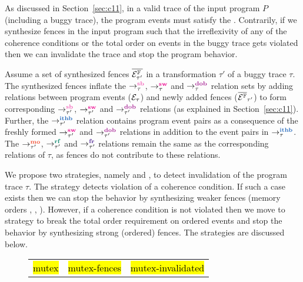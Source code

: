 As discussed in Section~\ref{sec:c11}, in a valid trace of the
input program $P$ (including a buggy trace), 
the program events must satisfy the .
%
Contrarily, if we synthesize \cc fences in the input program 
such that the irreflexivity of any of the coherence conditions 
or the total order on \sc events in the buggy trace gets violated 
then we can invalidate the trace and stop the program behavior.

Assume a set of synthesized \cc fences $\overline{\mathcal{E}^{\mathbb{F}}_{\tau'}}$
in a transformation $\tau'$ of a buggy trace $\tau$. 
%
The synthesized fences inflate the 
$\setSB$, $\setSW$ and $\setDOB$ relation sets by adding 
relations between program events ($\mathcal{E}_\tau$) and newly 
added fences ($\overline{\mathcal{E}^{\mathbb{F}}}_{\tau'}$) to form corresponding 
$\seqb{\tau'}{}{}$, $\sw{\tau'}{}{}$ and $\dob{\tau'}{}{}$ 
relations (as explained in Section~\ref{sec:c11}). 
%
Further, the $\ithb{\tau'}{}{}$ relation contains  
program event pairs as a consequence of the freshly formed 
$\sw{\tau'}{}{}$ and $\dob{\tau'}{}{}$ relations in addition
to the event pairs in $\setITHB$.
%
The $\mo{\tau'}{}{}$, $\rf{\tau'}{}{}$ and $\fr{\tau'}{}{}$ 
relations remain the same as the corresponding relations of 
$\tau$, as fences do not contribute to these relations.

We propose two strategies, namely \stfence and \wkfence, to 
detect invalidation of the program trace $\tau$. 
%
The \wkfence strategy detects violation of a coherence condition.
If such a case exists then we can stop the behavior by
synthesizing weaker fences (memory orders \rel, \acq, \acqrel). 
%
However, if a coherence condition is not violated then we move
to \stfence strategy to break the total order requirement on
\sc ordered events and stop the behavior by synthesizing 
strong (\sc ordered) fences.
%
The strategies are discussed below.\newline

\begin{figure}[t]
	\begin{tabular}{|c|c|c|}
		\hline
		\resizebox{0.33\textwidth}{!}{} &
		\resizebox{0.33\textwidth}{!}{} &
		\resizebox{0.33\textwidth}{!}{} \\
		\hline
		\multicolumn{1}{c}{\hl{mutex}} &
		\multicolumn{1}{c}{\hl{mutex-fences}} &
		\multicolumn{1}{c}{\hl{mutex-invalidated}} 
	\end{tabular}
\end{figure}


